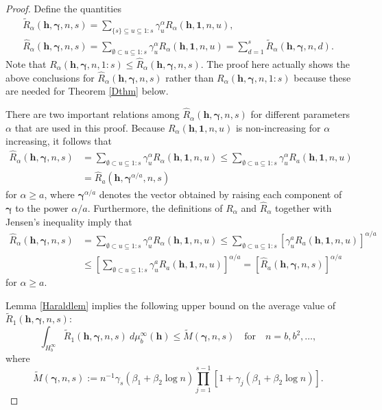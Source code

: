 \documentclass{article}
\renewcommand{\vec}[1]{\ensuremath{\mathbf{#1}}}
\newcommand{\vecsym}[1]{\ensuremath{\boldsymbol{#1}}}
\newcommand{\bfgam}{\vecsym \gamma}
\newcommand{\one}{\vecsym 1}
\newcommand{\h}{\vec h}
\begin{document}
\begin{proof} Define the quantities
\begin{gather}
    \tilde{R}_{\alpha}(\h,\bfgam,n,s) = \sum_{\{s\} \subseteq u \subseteq
    1:s} \gamma_{u}^{\alpha} R_{\alpha}(\h,\one,n,u), \nonumber \\
    \label{Rhatdef}
    \hat{R}_{\alpha}(\h,\bfgam,n,s) = \sum_{\emptyset \subset u
    \subseteq 1:s} \gamma_{u}^{\alpha} R_{\alpha}(\h,\one,n,u) =
    \sum_{d=1}^{s} \tilde{R}_{\alpha}(\h,\bfgam,n,d).
\end{gather}
Note that $R_{\alpha}(\h,\bfgam,n,1:s) \le
\hat{R}_{\alpha}(\h,\bfgam,n,s)$.  The proof here actually shows the
above conclusions for $\hat{R}_{\alpha}(\h,\bfgam,n,s)$ rather than
$R_{\alpha}(\h,\bfgam,n,1:s)$ because these are needed for Theorem
\ref{Dthm} below.  

There are two important relations among 
$\hat{R}_{\alpha}(\h,\bfgam,n,s)$ for different parameters $\alpha$ 
that are used in this proof.  Because $R_{\alpha}(\h,\one,n,u)$ is 
non-increasing for $\alpha$ increasing, it follows that
\begin{align}
    \hat{R}_{\alpha}(\h,\bfgam,n,s) &  = \sum_{\emptyset \subset u
    \subseteq 1:s} \gamma_{u}^{\alpha} R_{\alpha}(\h,\one,n,u) 
    \le \sum_{\emptyset \subset u
    \subseteq 1:s} \gamma_{u}^{\alpha} R_{a}(\h,\one,n,u) \nonumber \\
    & = \hat{R}_{a}(\h,\bfgam^{\alpha/a},n,s) \label{mono}
\end{align}
for $\alpha \ge a$, where $\bfgam^{\alpha/a}$ denotes the vector
obtained by raising each component of $\bfgam$ to the power
$\alpha/a$.  Furthermore, the definitions of $R_{\alpha}$ and
$\hat{R}_{\alpha}$ together with Jensen's inequality imply that
\begin{align}
    \hat{R}_{\alpha}(\h,\bfgam,n,s) &  = \sum_{\emptyset \subset u
    \subseteq 1:s} \gamma_{u}^{\alpha} R_{\alpha}(\h,\one,n,u) 
    \le \sum_{\emptyset \subset u
    \subseteq 1:s} [\gamma_{u}^{a} R_{a}(\h,\one,n,u) ]^{\alpha/a} \nonumber \\
    &\le \left[\sum_{\emptyset \subset u
    \subseteq 1:s} \gamma_{u}^{a} R_{a}(\h,\one,n,u) 
    \right]^{\alpha/a} = [\hat{R}_{a}(\h,\bfgam,n,s)]^{\alpha/a} \label{Jens}
\end{align}
for $\alpha \ge a$.
    
Lemma \ref{Haraldlem} implies the
following upper bound on the average value of
$\tilde{R}_{1}(\h,\bfgam,n,s)$:
$$
\int_{H_{b}^{\infty}} \tilde{R}_{1}(\h,\bfgam,n,s) \ d\mu_{b}^{\infty}(\h)
\le \tilde{M}(\bfgam,n,s) \quad \text{for} \quad n=b, 
b^{2}, \ldots,
$$
where
$$
\tilde{M}(\bfgam,n,s) := n^{-1} \gamma_{s} (\beta_{1}
+ \beta_{2} \log n) \prod_{j=1}^{s-1}[1+\gamma_{j} (\beta_{1} +
\beta_{2} \log n)].
$$


\end{proof}
\end{document}
